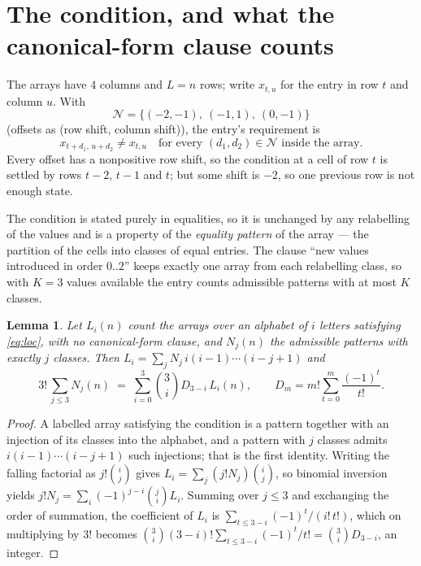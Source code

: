 \documentclass[11pt,a4paper]{article}
\theoremstyle{plain}
\newtheorem{lemma}[theorem]{Lemma}
\theoremstyle{definition}
\begin{document}
\section{The condition, and what the canonical-form clause counts}

The arrays have $4$ columns and $L=n$ rows; write $x_{t,u}$ for the entry in
row $t$ and column $u$. With
\[
\mathcal N=\{(-2,-1),\ (-1,1),\ (0,-1)\}
\]
(offsets as (row shift, column shift)), the entry's requirement is
\begin{equation}\label{eq:loc}
x_{t+d_1,\,u+d_2}\ne x_{t,u}\quad\text{for every }(d_1,d_2)\in\mathcal N\text{ inside the array}.
\end{equation}
Every offset has a nonpositive row shift, so the condition at a cell of row $t$ is
settled by rows $t-2$, $t-1$ and $t$; but some shift is $-2$, so one previous row is not
enough state.

The condition is stated purely in equalities, so it is unchanged by any relabelling of the
values and is a property of the \emph{equality pattern} of the array --- the partition of
the cells into classes of equal entries. The clause ``new values introduced in order
$0..2$'' keeps exactly one array from each relabelling class, so with $K=3$ values
available the entry counts admissible patterns with at most $K$ classes.

\begin{lemma}\label{lem:inv}
Let $L_i(n)$ count the arrays over an alphabet of $i$ letters satisfying \eqref{eq:loc},
with no canonical-form clause, and $N_j(n)$ the admissible patterns with exactly $j$ classes.
Then $L_i=\sum_j N_j\,i(i-1)\cdots(i-j+1)$ and
\[
3!\,\sum_{j\le 3}N_j(n)\;=\;\sum_{i=0}^{3}\binom{3}{i}D_{3-i}\,L_i(n),
\qquad D_m=m!\sum_{t=0}^{m}\frac{(-1)^t}{t!} .
\]
\end{lemma}

\begin{proof}
A labelled array satisfying the condition is a pattern together with an injection of its
classes into the alphabet, and a pattern with $j$ classes admits $i(i-1)\cdots(i-j+1)$ such
injections; that is the first identity. Writing the falling factorial as $j!\binom{i}{j}$
gives $L_i=\sum_j(j!N_j)\binom{i}{j}$, so binomial inversion yields
$j!N_j=\sum_i(-1)^{j-i}\binom{j}{i}L_i$. Summing over $j\le3$ and exchanging the
order of summation, the coefficient of $L_i$ is $\sum_{t\le3-i}(-1)^t/(i!\,t!)$, which on
multiplying by $3!$ becomes
$\binom{3}{i}(3-i)!\sum_{t\le3-i}(-1)^t/t!=\binom{3}{i}D_{3-i}$, an
integer.
\end{proof}
\end{document}
